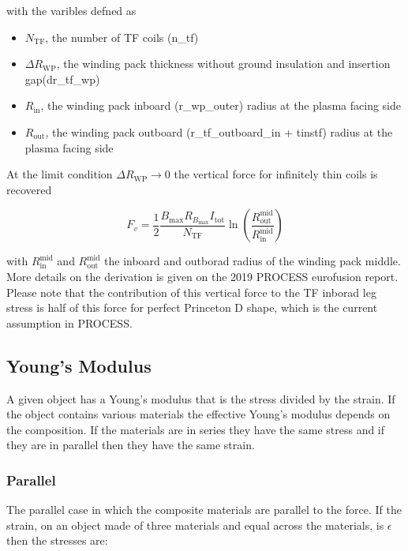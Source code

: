 \documentclass[hidelinks]{article}
\numberwithin{equation}{section}
\begin{document}
    \noi with the varibles defned as 
    \begin{itemize}
        \item $N_\mathrm{TF}$, the number of TF coils (n\_tf)
        \item $\Delta R_\mathrm{WP}$, the winding pack thickness without ground insulation and
              insertion gap(dr\_tf\_wp)
        \item $R_\mathrm{in}$, the winding pack inboard (r\_wp\_outer) radius at the plasma facing side
        \item $R_\mathrm{out}$, the winding pack outboard (r\_tf\_outboard\_in + tinstf) radius at the plasma facing side 
    \end{itemize}

    \noi At the limit condition $\Delta R_\mathrm{WP} \rightarrow 0$ the vertical force for infinitely 
    thin coils is recovered
    
    \begin{equation}
        F_v = \frac{1}{2} \frac{B_\text{max}R_{B_\mathrm{max}} I_\mathrm{tot}}{N_\mathrm{TF}}\ln\left(\frac{R_\mathrm{out}^\mathrm{mid}}{R_\mathrm{in}^\mathrm{mid}}\right)
    \end{equation}
    
    \noi with $R_\mathrm{in}^\mathrm{mid}$ and $R_\mathrm{out}^\mathrm{mid}$ the inboard 
    and outborad radius of the winding pack middle. More details on the derivation 
    is given on the 2019 PROCESS eurofusion report. Please note that the contribution
    of this vertical force to the TF inborad leg stress is half of this force for perfect
    Princeton D shape, which is the current assumption in PROCESS. 

    \subsection{Young's Modulus}

    A given object has a Young's modulus that is the stress divided by the strain. If 
    the object contains various materials the effective Young's modulus depends on the 
    composition. If the materials are in series they have the same stress and if they 
    are in parallel then they have the same strain.

    \subsubsection{Parallel}

    The parallel case in which the composite materials are parallel to the force. If the 
    strain, on an object made of three materials and equal across the materials, is 
    $\epsilon$ then the stresses are:
\end{document}
